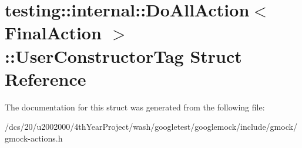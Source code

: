 \hypertarget{structtesting_1_1internal_1_1DoAllAction_3_01FinalAction_01_4_1_1UserConstructorTag}{}\section{testing\+:\+:internal\+:\+:Do\+All\+Action$<$ Final\+Action $>$\+:\+:User\+Constructor\+Tag Struct Reference}
\label{structtesting_1_1internal_1_1DoAllAction_3_01FinalAction_01_4_1_1UserConstructorTag}


The documentation for this struct was generated from the following file\+:\begin{DoxyCompactItemize}
\item 
/dcs/20/u2002000/4th\+Year\+Project/wash/googletest/googlemock/include/gmock/gmock-\/actions.\+h\end{DoxyCompactItemize}
